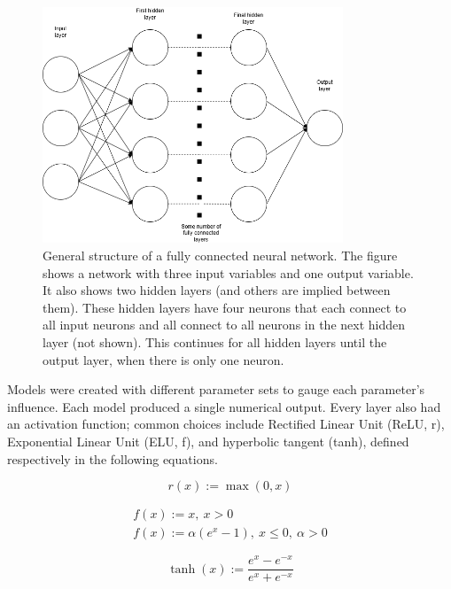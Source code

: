 \begin{figure}[H]
    \centering
    \includegraphics[width=0.8\textwidth]{figures/neural_network.drawio_updated.png}
    \caption[General structure of a fully connected neural network]{General structure of a fully connected neural network. The figure shows a network with three input variables and one output variable. It also shows two hidden layers (and others are implied between them). These hidden layers have four neurons that each connect to all input neurons and all connect to all neurons in the next hidden layer (not shown). This continues for all hidden layers until the output layer, when there is only one neuron.}
    \label{fig:nn_structure}
\end{figure}

Models were created with different parameter sets to gauge each parameter’s influence. Each model produced a single numerical output. Every layer also had an activation function; common choices include Rectified Linear Unit (ReLU, r), Exponential Linear Unit (ELU, f), and hyperbolic tangent (tanh), defined respectively in the following equations.

\begin{equation*}
    r(x):=\max(0, x)
\end{equation*}

\begin{align*}
    f(x) := x,\ x > 0\\
    f(x) := \alpha (e^x-1),\ x\leq 0,\ \alpha > 0
\end{align*}

\begin{equation*}
    \operatorname{tanh}(x):=\frac{e^x-e^{-x}}{e^x+e^{-x}}
\end{equation*}

